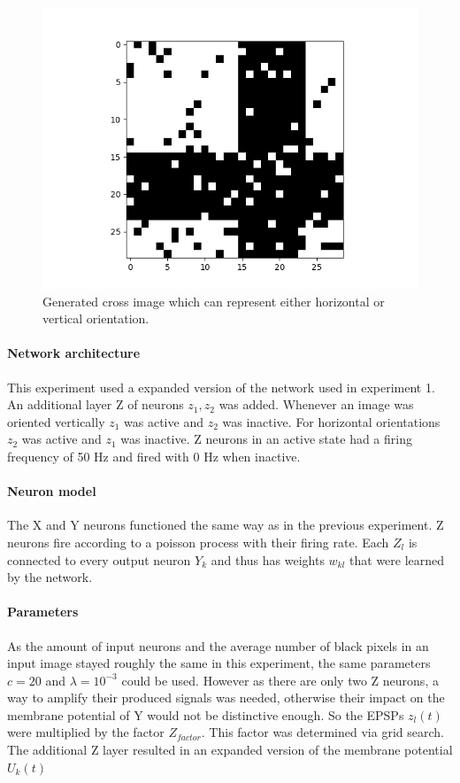 \begin{figure}
  \includegraphics[width=0.6\linewidth]{figures/horvert/horvertTrainingCrossImage.png}
  \caption{Generated cross image which can represent either horizontal or vertical orientation.}
  \label{fig:horvertTrainingCrossImage}
\end{figure}


\paragraph{Network architecture}

This experiment used a expanded version of the network used in experiment 1. An additional layer Z of neurons $z_1,z_2$ was added. Whenever an image was oriented vertically $z_1$ was active and $z_2$ was inactive. For horizontal orientations $z_2$ was active and $z_1$ was inactive. Z neurons in an active state had a firing frequency of 50 Hz and fired with 0 Hz when inactive.

\paragraph{Neuron model}
The X and Y neurons functioned the same way as in the previous experiment. Z neurons fire according to a poisson process with their firing rate. Each $Z_l$ is connected to every output neuron $Y_k$ and thus has weights $w_{kl}$ that were learned by the network. 

\paragraph{Parameters}
As the amount of input neurons and the average number of black pixels in an input image stayed roughly the same in this experiment, the same parameters $c=  20$ and $\lambda = 10^{-3}$ could be used. However as there are only two Z neurons, a way to amplify their produced signals was needed, otherwise their impact on the membrane potential of Y would not be distinctive enough. So the EPSPs $z_l(t)$ were multiplied by the factor $Z_{factor}$. This factor was determined via grid search. The additional Z layer resulted in an expanded version of the membrane potential $U_k(t)$

